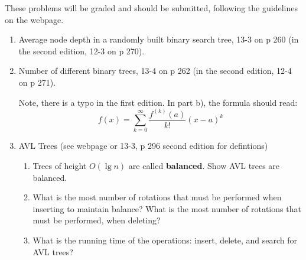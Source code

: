 \documentclass[11pt]{article}
\begin{document}
These problems will be graded and should be submitted, following the
guidelines on the webpage.

\begin{enumerate}
    \item Average node depth in a randomly built binary search tree,
	13-3 on p 260 (in the second edition, 12-3 on p 270).
    \item Number of different binary trees,
	13-4 on p 262 (in the second edition, 12-4 on p 271).

	Note, there is a typo in the first edition.  In part b), the
	formula should read:
	$$
		f(x) = \sum_{k=0}^{\infty} \frac{f^{(k)}(a)}{k!} {(x-a)}^k
	$$
    \item AVL Trees (see webpage or 13-3, p 296 second edition for 
	defintions)

	\begin{enumerate}
	    \item Trees of height $O(\lg n)$ are called {\bf balanced}.
		Show AVL trees are balanced.
	    \item What is the most number of rotations that must be 
		performed when inserting to maintain balance?  
		What is the most number 
		of rotations that must be performed, when deleting?
	    \item What is the running time of the operations: insert,
		delete, and search for AVL trees?
	\end{enumerate}


\end{enumerate}
\end{document}
